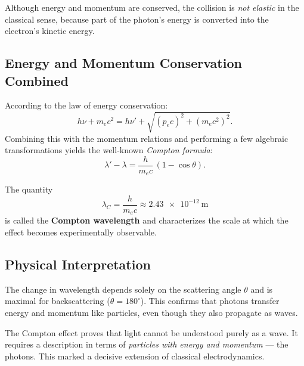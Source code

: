 \begin{NoteBox}
	Although energy and momentum are conserved, 
	the collision is \emph{not elastic} in the classical sense, 
	because part of the photon’s energy is converted into the electron’s kinetic energy.
\end{NoteBox}

\subsection{Energy and Momentum Conservation Combined}
According to the law of energy conservation:
\[
h\nu + m_e c^2 = h\nu' + \sqrt{(p_e c)^2 + (m_e c^2)^2}.
\]
Combining this with the momentum relations 
and performing a few algebraic transformations yields the well-known \emph{Compton formula}:
\[
\lambda' - \lambda = \frac{h}{m_e c}\,(1 - \cos\theta).
\]

\begin{MathBox}
	The quantity
	\[
	\lambda_C = \frac{h}{m_e c} \approx \SI{2.43e-12}{\meter}
	\]
	is called the \textbf{Compton wavelength} 
	and characterizes the scale at which the effect becomes experimentally observable.
\end{MathBox}

\subsection{Physical Interpretation}
The change in wavelength depends solely on the scattering angle \( \theta \) 
and is maximal for backscattering (\( \theta = 180^\circ \)). 
This confirms that photons transfer energy and momentum like particles, 
even though they also propagate as waves.

\begin{DidacticBox}
	The Compton effect proves that light cannot be understood purely as a wave. 
	It requires a description in terms of \emph{particles with energy and momentum} — 
	the photons. This marked a decisive extension of classical electrodynamics.
\end{DidacticBox}

